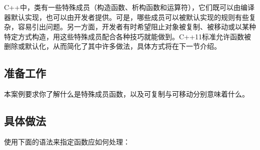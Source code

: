 
C++中，类有一些特殊成员（构造函数、析构函数和运算符），它们既可以由编译器默认实现，也可以由开发者提供。可是，哪些成员可以被默认实现的规则有些复杂，容易引出问题。另一方面，开发者有时希望阻止对象被复制、被移动或以某种特定方式构造，用这些特殊成员配合各种技巧就能做到。C++11标准允许函数被删除或默认化，从而简化了其中许多做法，具体方式将在下一节介绍。



\subsection{准备工作}



本案例要求你了解什么是特殊成员函数，以及可复制与可移动分别意味着什么。



\subsection{具体做法}



使用下面的语法来指定函数应如何处理：



